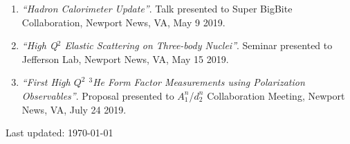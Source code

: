 \documentclass[letterpaper,10pt]{article}
\def\footerlink{}
\begin{document}
{\begin{enumerate}
		\item \textit{``Hadron Calorimeter Update''}. Talk presented to Super BigBite Collaboration, Newport News, VA, May 9 2019.
		
		\item \textit{``High Q$^2$ Elastic Scattering on Three-body Nuclei''}. Seminar presented to Jefferson Lab, Newport News, VA, May 15 2019.
		
		\item \textit{``First High $Q^2$ $^3$He Form Factor Measurements using Polarization Observables''}. Proposal presented to $A_1^n$/$d_2^n$ Collaboration Meeting, Newport News, VA, July 24 2019.
	
	\end{enumerate}


\bigskip
\begin{center}
  \begin{footnotesize}
    Last updated: \today \\
    \href{\footerlink}{\texttt{\footerlink}}
  \end{footnotesize}
\end{center}
}
\end{document}
